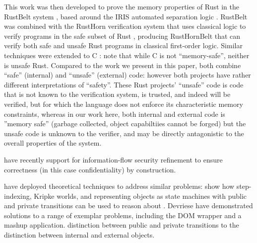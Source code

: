 This work was then developed to prove the memory properties of Rust in
the RustBelt system \cite{RustBelt18}, based around the IRIS automated
separation logic \cite{iris-jfp2018}.  RustBelt was combined with the
RustHorn verification system that uses classical logic to verify
programs in the safe subset of Rust \cite{RustHorn-pldi2022},
producing RustHornBelt \cite{RustHornBelt-pldi2022} that can verify
both safe and unsafe Rust programs in classical first-order logic.
Similar techniques were extended to C \cite{RefinedC-pldi2021}:
note that while C is not ``memory-safe'', neither is unsafe Rust.
Compared to the work we present in this paper, both combine ``safe''
(internal) and ``unsafe'' (external) code: however both projects have
rather different interpretations of ``safety''.  These Rust projects'
``unsafe'' code is code that is not known to the verification system,
is trusted, and indeed will be verified, but for which the language
does not enforce its characteristic memory constraints, whereas in our
work here, both internal and external code is ''memory safe'' (garbage
collected, object capabiltiies cannot be forged) but the unsafe code
is unknown to the verifier, and may be directly antagonistic to the
overall properties of the system.



\citet{schaeferCbC} have recently
  support for information-flow security %
 refinement to ensure correctness (in this case confidentiality) by
construction. 





 
\citet{dd}  have deployed
  theoretical techniques to address similar problems:  %
   show how step-indexing, Kripke worlds, and representing objects
as state machines with public and private transitions can be used to
reason about %
.
Devriese have demonstrated solutions to a range of exemplar problems,
including the DOM wrapper and a mashup application.
 distinction
between public and private transitions %
 to the
distinction between internal and external objects.


